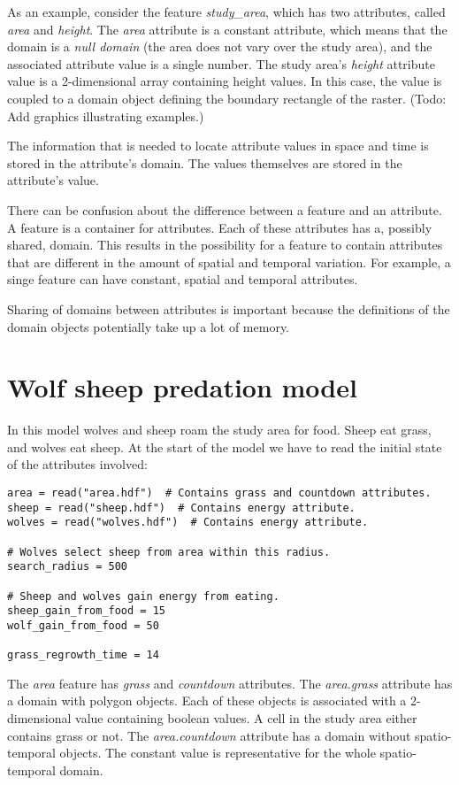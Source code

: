 \documentclass[10pt, a4paper]{article}
\begin{document}
As an example, consider the feature \emph{study\_area}, which has two attributes, called \emph{area} and \emph{height}. The \emph{area} attribute is a constant attribute, which means that the domain is a \emph{null domain} (the area does not vary over the study area), and the associated attribute value is a single number. The study area's \emph{height} attribute value is a 2-dimensional array containing height values. In this case, the value is coupled to a domain object defining the boundary rectangle of the raster. (Todo: Add graphics illustrating examples.)

The information that is needed to locate attribute values in space and time is stored in the attribute's domain. The values themselves are stored in the attribute's value.

There can be confusion about the difference between a feature and an attribute. A feature is a container for attributes. Each of these attributes has a, possibly shared, domain. This results in the possibility for a feature to contain attributes that are different in the amount of spatial and temporal variation. For example, a singe feature can have constant, spatial and temporal attributes.

Sharing of domains between attributes is important because the definitions of the domain objects potentially take up a lot of memory.

\section{Wolf sheep predation model}
In this model wolves and sheep roam the study area for food. Sheep eat grass, and wolves eat sheep. At the start of the model we have to read the initial state of the attributes involved:

\begin{lstlisting}
area = read("area.hdf")  # Contains grass and countdown attributes.
sheep = read("sheep.hdf")  # Contains energy attribute.
wolves = read("wolves.hdf")  # Contains energy attribute.

# Wolves select sheep from area within this radius.
search_radius = 500

# Sheep and wolves gain energy from eating.
sheep_gain_from_food = 15
wolf_gain_from_food = 50

grass_regrowth_time = 14
\end{lstlisting}

The \emph{area} feature has \emph{grass} and \emph{countdown} attributes. The \emph{area.grass} attribute has a domain with polygon objects. Each of these objects is associated with a 2-dimensional value containing boolean values. A cell in the study area either contains grass or not. The \emph{area.countdown} attribute has a domain without spatio-temporal objects. The constant value is representative for the whole spatio-temporal domain.
\end{document}

